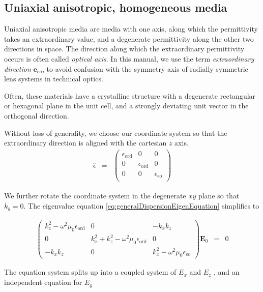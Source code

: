 \documentclass[12pt,a4paper,twoside,openright,BCOR10mm,headsepline,titlepage,abstracton,chapterprefix,final]{scrreprt}
\newcommand\Vector[1]{{\mathbf{#1}}}
\newcommand\vacuum{0}
\newcommand\wavenumber{k}
\newcommand\Tensor[1]{\hat{#1}}
\newcommand\scalarEfield{E}
\newcommand\Efield{\Vector{\scalarEfield}}
\newcommand\vacuumpermeability{\mu_{\vacuum}}
\newcommand\permittivity{\Tensor{\epsilon}}
\newcommand\scalarpermittivity{\epsilon}
\newcommand\ordi{\text{ord}}
\newcommand\eo{\text{eo}}
\begin{document}
\subsection{Uniaxial anisotropic, homogeneous media}
Uniaxial anisotropic media are media with one axis, along which the permittivity takes an extraordinary value, 
and a degenerate permittivity along the other two directions in space.
The direction along which the extraordinary permittivity occurs is often called \emph{optical axis}. 
In this manual, we use the term \emph{extraordinary direction} $\Vector{e}_{eo}$, to avoid confusion with the symmetry axis of radially symmetric lens systems in technical optics.

Often, these materials have a crystalline structure with a degenerate rectangular or hexagonal plane in the unit cell, 
and a strongly deviating unit vector in the orthogonal direction. 

Without loss of generality, we choose our coordinate system so that the extraordinary direction is aligned with the cartesian $z$ axis.
\begin{eqnarray}
 \permittivity &=&
 \begin{pmatrix}
  \scalarpermittivity_{\ordi}  & 0 & 0 \\
  0 & \scalarpermittivity_{\ordi}  & 0 \\
  0 & 0 & \scalarpermittivity_{\eo}   \\
 \end{pmatrix}
\end{eqnarray}

We further rotate the coordinate system in the degenerate $xy$ plane so that $\wavenumber_y = 0$.
The eigenvalue equation \ref{eq:generalDispersionEigenEquation} simplifies to

\begin{eqnarray}
\begin{pmatrix}
 \wavenumber_z^2 - \omega^2 \vacuumpermeability \scalarpermittivity_{\ordi} 
 &
 0
 &
 - \wavenumber_x \wavenumber_z 
 \\
 0
 &
 \wavenumber_x^2 + \wavenumber_z^2 - \omega^2 \vacuumpermeability \scalarpermittivity_{\ordi} 
 &
 0 
 \\
 - \wavenumber_x \wavenumber_z 
 &
 0 
 &
 \wavenumber_x^2 - \omega^2 \vacuumpermeability \scalarpermittivity_{\eo}  
\end{pmatrix}
\Efield_0
&=& 0
\end{eqnarray}

The equation system splits up into a coupled system of $\scalarEfield_x$ and $\scalarEfield_z$ , and an independent equation for $\scalarEfield_y$
\end{document}
